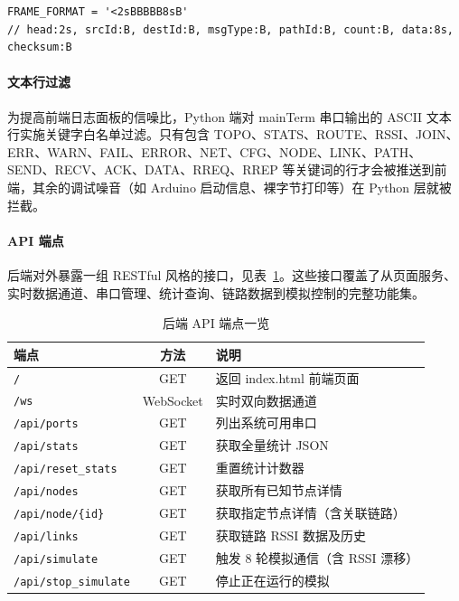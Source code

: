 \documentclass[12pt,a4paper]{ctexart}
\newcommand{\tblheaderstyle}{\sffamily\small\color{white}}
\begin{document}
\begin{lstlisting}[]
FRAME_FORMAT = '<2sBBBBB8sB'
// head:2s, srcId:B, destId:B, msgType:B, pathId:B, count:B, data:8s, checksum:B
\end{lstlisting}

\paragraph{文本行过滤}
为提高前端日志面板的信噪比，Python 端对 mainTerm 串口输出的 ASCII 文本行实施关键字白名单过滤。只有包含 TOPO、STATS、ROUTE、RSSI、JOIN、ERR、WARN、FAIL、ERROR、NET、CFG、NODE、LINK、PATH、SEND、RECV、ACK、DATA、RREQ、RREP 等关键词的行才会被推送到前端，其余的调试噪音（如 Arduino 启动信息、裸字节打印等）在 Python 层就被拦截。

\paragraph{API 端点}
后端对外暴露一组 RESTful 风格的接口，见表~\ref{tab:apiendpoints}。这些接口覆盖了从页面服务、实时数据通道、串口管理、统计查询、链路数据到模拟控制的完整功能集。

\begin{table}[htbp]
\centering
\caption{后端 API 端点一览}
\label{tab:apiendpoints}
\begin{tabularx}{\textwidth}{l c >{\raggedright\arraybackslash}X}
\toprule
\rowcolor{tblhead}\tblheaderstyle 端点 & \tblheaderstyle 方法 & \tblheaderstyle 说明 \\
\midrule
\texttt{/}                    & GET       & 返回 index.html 前端页面 \\
\texttt{/ws}                  & WebSocket & 实时双向数据通道 \\
\texttt{/api/ports}           & GET       & 列出系统可用串口 \\
\texttt{/api/stats}           & GET       & 获取全量统计 JSON \\
\texttt{/api/reset\_stats}    & GET       & 重置统计计数器 \\
\texttt{/api/nodes}           & GET       & 获取所有已知节点详情 \\
\texttt{/api/node/\{id\}}      & GET       & 获取指定节点详情（含关联链路） \\
\texttt{/api/links}           & GET       & 获取链路 RSSI 数据及历史 \\
\texttt{/api/simulate}        & GET       & 触发 8 轮模拟通信（含 RSSI 漂移） \\
\texttt{/api/stop\_simulate}  & GET       & 停止正在运行的模拟 \\
\bottomrule
\end{tabularx}
\end{table}
\end{document}
